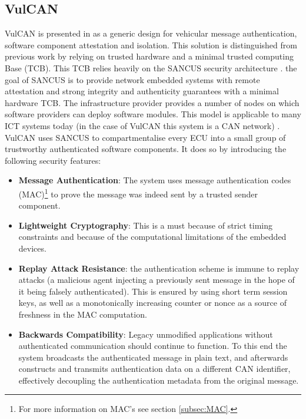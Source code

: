 \subsection{VulCAN}
\label{subsec:vulcan}

VulCAN is presented in \cite{VulCAN} as a generic design for vehicular message authentication, software component attestation and isolation. This solution is distinguished from previous work by relying on trusted hardware and a minimal trusted computing Base (TCB). This TCB relies heavily on the SANCUS security architecture \cite{Sancus}. the goal of SANCUS is to provide network embedded systems with remote attestation and strong integrity and authenticity guarantees with a minimal hardware TCB. The infrastructure provider provides a number of nodes on which software providers can deploy software modules. This model is applicable to many ICT systems today (in the case of VulCAN this system is a CAN network) \cite{Sancus}. VulCAN uses SANCUS to compartmentalise every ECU into a small group of trustworthy authenticated software components. It does so by introducing the following security features: 

\begin{itemize}
	\item \textbf{Message Authentication}: The system uses message authentication codes (MAC)\footnote{For more information on MAC's see section \ref{subsec:MAC}.} to prove the message was indeed sent by a trusted sender component.
	
	\item \textbf{Lightweight Cryptography}: This is a must because of strict timing constraints and because of the computational limitations of the embedded devices. 
	
	\item \textbf{Replay Attack Resistance}: the authentication scheme is immune to replay attacks (a malicious agent injecting a previously sent message in the hope of it being falsely authenticated). This is ensured by using short term session keys, as well as a monotonically increasing counter or nonce as a source of freshness in the MAC computation.
	
	\item \textbf{Backwards Compatibility}: Legacy unmodified applications without authenticated communication should continue to function. To this end the system broadcasts the authenticated message in plain text, and afterwards constructs and transmits authentication data on a different CAN identifier, effectively decoupling the authentication metadata from the original message.
\end{itemize}



